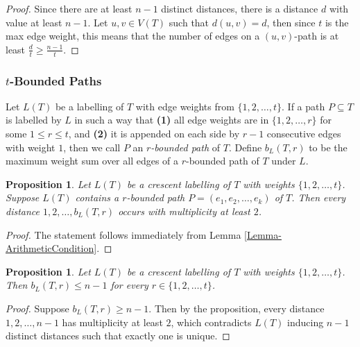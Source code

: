 \documentclass[12]{article}
\newtheorem{prop}[thm]{Proposition}
\theoremstyle{definition}
\begin{document}
\begin{proof}
	Since there are at least $n-1$ distinct distances, there is a distance $d$ with value at least $n-1$.  Let $u,v \in V(T)$ such that $d(u,v) = d$, then since $t$ is the max edge weight, this means that the number of edges on a $(u,v)$-path is at least $\tfrac{d}{t} \geq \tfrac{n-1}{t}$.
\end{proof}

\subsubsection{$t$-Bounded Paths}

Let $L(T)$ be a labelling of $T$ with edge weights from $\{1,2,\ldots, t\}$.  If a path $P \subseteq T$ is labelled by $L$ in such a way that \textbf{(1)} all edge weights are in $\{1,2,\ldots, r\}$ for some $1 \leq r \leq t$, and \textbf{(2)} it is appended on each side by $r-1$ consecutive edges with weight $1$, then we call $P$ an \emph{$r$-bounded path} of $T$.  Define $b_L(T,r)$ to be the maximum weight sum over all edges of a $r$-bounded path of $T$ under $L$.

\begin{prop}
	Let $L(T)$ be a crescent labelling of $T$ with weights $\{1,2,\ldots,t\}$.  Suppose $L(T)$ contains a $r$-bounded path $P = (e_1,e_2,\ldots,e_k)$ of $T$.  Then every distance $1,2,\ldots, b_L(T,r)$ occurs with multiplicity at least $2$. %
\end{prop}
\begin{proof}
	The statement follows immediately from Lemma \ref{Lemma-ArithmeticCondition}.
\end{proof}

\begin{prop}
	Let $L(T)$ be a crescent labelling of $T$ with weights $\{1,2,\ldots,t\}$.  Then $b_L(T,r) \leq n-1$ for every $r \in \{1,2,\ldots,t\}$.
\end{prop}

\begin{proof}
	Suppose $b_L(T,r) \geq n-1$.  Then by the proposition, every distance $1,2,\ldots,n-1$ has multiplicity at least $2$, which contradicts $L(T)$ inducing $n-1$ distinct distances such that exactly one is unique.
\end{proof}
\end{document}

